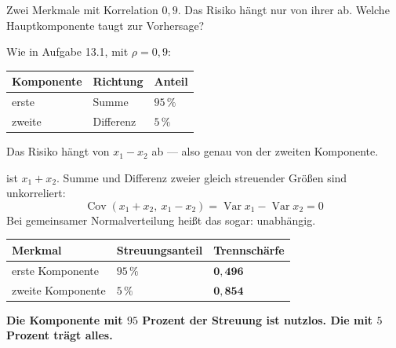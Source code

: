 \begin{aufgabe}
Zwei Merkmale mit Korrelation $0{,}9$. Das Risiko hängt nur von ihrer  ab. Welche Hauptkomponente taugt zur Vorhersage?

\loesung
{}
Wie in Aufgabe 13.1, mit $\rho = 0{,}9$:
\begin{center}
{\small
\renewcommand{\arraystretch}{1.5}
\begin{tabular}{@{}P{2.4cm}P{2.6cm}P{1.6cm}@{}}
\toprule
\textbf{Komponente} & \textbf{Richtung} & \textbf{Anteil}\\
\midrule
erste & Summe & $95\,\%$\\
zweite & Differenz & $5\,\%$\\
\bottomrule
\end{tabular}}
\end{center}

Das Risiko hängt von $x_1 - x_2$ ab --- also genau von der zweiten Komponente.

 ist $x_1 + x_2$. Summe und Differenz zweier gleich streuender Größen sind unkorreliert:
\[ \operatorname{Cov}(x_1+x_2,\ x_1-x_2) = \operatorname{Var}x_1 - \operatorname{Var}x_2 = 0 \]
Bei gemeinsamer Normalverteilung heißt das sogar: unabhängig.

\begin{center}
{\small
\renewcommand{\arraystretch}{1.5}
\begin{tabular}{@{}P{3.0cm}P{2.6cm}P{2.4cm}@{}}
\toprule
\textbf{Merkmal} & \textbf{Streuungs\-anteil} & \textbf{Trennschärfe}\\
\midrule
erste Komponente & $95\,\%$ & $\mathbf{0{,}496}$\\
zweite Komponente & $5\,\%$ & $\mathbf{0{,}854}$\\
\bottomrule
\end{tabular}}
\end{center}

\begin{center}
\begin{minipage}{0.9\textwidth}
\textbf{Die Komponente mit $95$ Prozent der Streuung ist nutzlos. Die mit $5$ Prozent trägt alles.}
\end{minipage}
\end{center}


\end{aufgabe}
